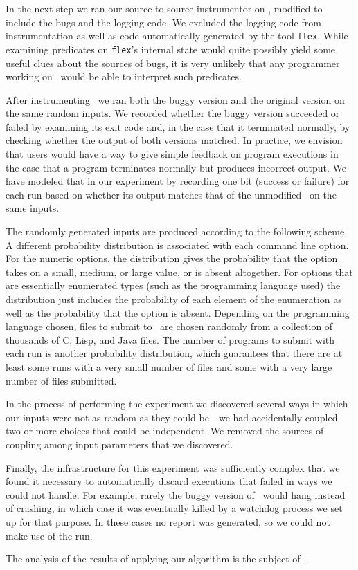 In the next step we ran our source-to-source instrumentor on \moss,
modified to include the bugs and the logging code.  We excluded the logging
code from instrumentation as well as code automatically generated by the tool
{\tt flex}.  While examining predicates on {\tt flex}'s internal state
would quite possibly yield some useful clues about the sources of
bugs, it is very unlikely that any programmer working on \moss\ would
be able to interpret such predicates.

After instrumenting \moss\ we ran both the buggy version and the
original version on the same random inputs. We recorded whether the buggy
version succeeded or failed by examining its exit code and, in the
case that it terminated normally, by checking whether the output of
both versions matched.  In practice, we envision that users would have
a way to give simple feedback on program executions in the case that a
program terminates normally but produces incorrect output.  We have
modeled that in our experiment by recording one bit (success or
failure) for each run based on whether its output matches that of the
unmodified \moss\ on the same inputs.

The randomly generated inputs are produced according to the following
scheme.  A different probability distribution is associated with each
command line option.  For the numeric options, the distribution gives
the probability that the option takes on a small, medium, or large
value, or is absent altogether.  For options that are essentially
enumerated types (such as the programming language used) the
distribution just includes the probability of each element of the
enumeration as well as the probability that the option is absent.
Depending on the programming language chosen, files to submit to
\moss\ are chosen randomly from a collection of thousands of C, Lisp,
and Java files.  The number of programs to submit with each run is
another probability distribution, which guarantees that there are at
least some runs with a very small number of files and some with a very
large number of files submitted.

In the process of performing the experiment we discovered several ways
in which our inputs were not as random as they could be---we had
accidentally coupled two or more choices that could be independent.
We removed the sources of coupling among input parameters that we
discovered.  

Finally, the infrastructure for this experiment was sufficiently complex
that we found it necessary to automatically discard executions that
failed in ways we could not handle.  For example, rarely the buggy version of
\moss\ would hang instead of crashing, in which case it was eventually killed
by a watchdog process we set up for that purpose.  In these cases no report
was generated, so we could not make use of the run.

The analysis of the results of applying our algorithm is the
subject of .

